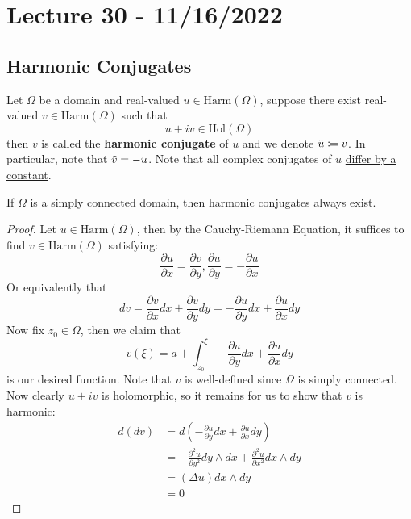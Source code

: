 \section{Lecture 30 - 11/16/2022}

\subsection{Harmonic Conjugates}

\begin{definition}
    Let $\Omega$ be a domain and real-valued $u \in \text{Harm}(\Omega)$, suppose there exist real-valued $v \in \text{Harm}(\Omega)$ such that
    \[u + iv \in \text{Hol}(\Omega)\]
    then $v$ is called the \textbf{harmonic conjugate} of $u$ and we denote $\Tilde{u} \coloneqq v$. In particular, note that $\Tilde{v} = -u$. Note that all complex conjugates of $u$ \underline{differ by a constant}.
\end{definition}

\begin{theorem}
    If $\Omega$ is a simply connected domain, then harmonic conjugates always exist.
\end{theorem}

\begin{proof}
    Let $u \in \text{Harm}(\Omega)$, then by the Cauchy-Riemann Equation, it suffices to find $v \in \text{Harm}(\Omega)$ satisfying:
    \[\frac{\partial u}{\partial x} = \frac{\partial v}{\partial y}, \frac{\partial u}{\partial y} = -\frac{\partial u}{\partial x}\]
    Or equivalently that
    \[dv = \frac{\partial v}{\partial x} dx + \frac{\partial v}{\partial y} dy = - \frac{\partial u}{\partial y} dx + \frac{\partial u}{\partial x} dy\]
    Now fix $z_0 \in \Omega$, then we claim that
    \[v(\xi) = a + \int_{z_0}^\xi - \frac{\partial u}{\partial y} dx + \frac{\partial u}{\partial x} dy\]
    is our desired function. Note that $v$ is well-defined since $\Omega$ is simply connected. Now clearly $u + iv$ is holomorphic, so it remains for us to show that $v$ is harmonic:
    \begin{align*}
        d(dv) &= d(- \frac{\partial u}{\partial y} dx + \frac{\partial u}{\partial x} dy)\\
        &= -\frac{\partial^2 u}{\partial y^2} dy \wedge dx + \frac{\partial^2 u}{\partial x^2} dx \wedge dy\\
        &= (\Delta u) dx \wedge dy\\
        &= 0 \tag*{$u$ is harmonic}
    \end{align*}
\end{proof}

